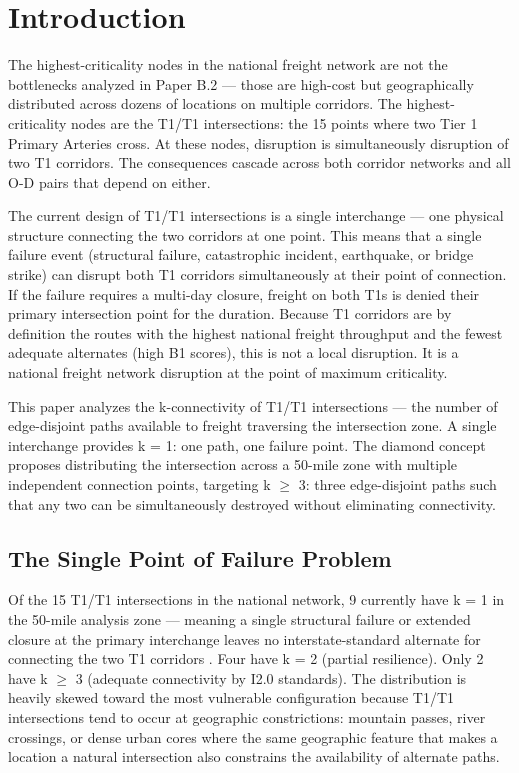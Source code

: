 \section{Introduction}

The highest-criticality nodes in the national freight network are not the bottlenecks analyzed in Paper B.2 --- those are high-cost but geographically distributed across dozens of locations on multiple corridors. The highest-criticality nodes are the T1/T1 intersections: the 15 points where two Tier 1 Primary Arteries cross. At these nodes, disruption is simultaneously disruption of two T1 corridors. The consequences cascade across both corridor networks and all O-D pairs that depend on either.

The current design of T1/T1 intersections is a single interchange --- one physical structure connecting the two corridors at one point. This means that a single failure event (structural failure, catastrophic incident, earthquake, or bridge strike) can disrupt both T1 corridors simultaneously at their point of connection. If the failure requires a multi-day closure, freight on both T1s is denied their primary intersection point for the duration. Because T1 corridors are by definition the routes with the highest national freight throughput and the fewest adequate alternates (high B1 scores), this is not a local disruption. It is a national freight network disruption at the point of maximum criticality.

This paper analyzes the k-connectivity of T1/T1 intersections --- the number of edge-disjoint paths available to freight traversing the intersection zone. A single interchange provides k = 1: one path, one failure point. The diamond concept \citep{ROUTE_B1} proposes distributing the intersection across a 50-mile zone with multiple independent connection points, targeting k $\geq$ 3: three edge-disjoint paths such that any two can be simultaneously destroyed without eliminating connectivity.

\subsection*{The Single Point of Failure Problem}

Of the 15 T1/T1 intersections in the national network, 9 currently have k = 1 in the 50-mile analysis zone --- meaning a single structural failure or extended closure at the primary interchange leaves no interstate-standard alternate for connecting the two T1 corridors \citep{ROUTE_diamond}. Four have k = 2 (partial resilience). Only 2 have k $\geq$ 3 (adequate connectivity by I2.0 standards). The distribution is heavily skewed toward the most vulnerable configuration because T1/T1 intersections tend to occur at geographic constrictions: mountain passes, river crossings, or dense urban cores where the same geographic feature that makes a location a natural intersection also constrains the availability of alternate paths.

